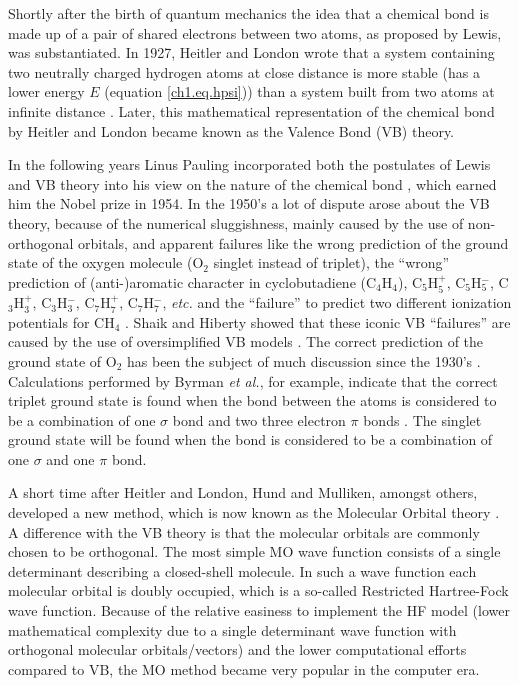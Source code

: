 Shortly after the birth of quantum mechanics the idea that a chemical bond is made up of a pair of shared electrons between two atoms, as proposed by Lewis, was substantiated. In 1927, Heitler and London wrote that a system containing two neutrally charged hydrogen atoms at close distance is more stable (has a lower energy $E$ (equation \ref{ch1.eq.hpsi})) than a system built from two atoms at infinite distance \cite{heitler}. Later, this mathematical representation of the chemical bond by Heitler and London became known as the Valence Bond (VB) theory. 

In the following years Linus Pauling incorporated both the postulates of Lewis and VB theory into his view on the nature of the chemical bond \cite{pauling1,pauling2,pauling3,pauling4,pauling5,pauling6,pauling7,paulingbook}, which earned him the Nobel prize in 1954. In the 1950's a lot of dispute arose about the VB theory, because of the numerical sluggishness, mainly caused by the use of non-orthogonal orbitals, and apparent failures like the wrong prediction of the ground state of the oxygen molecule (O$_2$ singlet instead of triplet), the ``wrong'' prediction of (anti-)aromatic character in cyclobutadiene (C$_4$H$_4$), C$_5$H$_{5}^{+}$, C$_5$H$_{5}^{-}$, C$_3$H$_{3}^{+}$, C$_3$H$_{3}^{-}$, C$_7$H$_{7}^{+}$, C$_7$H$_{7}^{-}$, \textit{etc.} and the ``failure'' to predict two different ionization potentials for CH$_4$ \cite{brush2}. Shaik and Hiberty showed that these iconic VB ``failures'' are caused by the use of oversimplified VB models \cite{antibrush}. The correct prediction of the ground state of O$_2$ has been the subject of much discussion since the 1930's \cite{o2_1,o2_2,o2_3,o2_4,o2_5,o2_6,o2_7,o2_8,o2_9,carsten}. Calculations performed by Byrman \textit{et al.}, for example, indicate that the correct triplet ground state is found when the bond between the atoms is considered to be a combination of one $\sigma$ bond and two three electron $\pi$ bonds \cite{carsten}. The singlet ground state will be found when the bond is considered to be a combination of one $\sigma$ and one $\pi$ bond.

A short time after Heitler and London, Hund and Mulliken, amongst others, developed a new method, which is now known as the Molecular Orbital theory \cite{hund,mulliken}. A difference with the VB theory is that the molecular orbitals are commonly chosen to be orthogonal. The most simple MO wave function consists of a single determinant describing a closed-shell molecule. In such a wave function each molecular orbital is doubly occupied, which is a so-called Restricted Hartree-Fock \cite{fock} wave function. Because of the relative easiness to implement the HF model (lower mathematical complexity due to a single determinant wave function with orthogonal molecular orbitals/vectors) and the lower computational efforts compared to VB, the MO method became very popular in the computer era.

